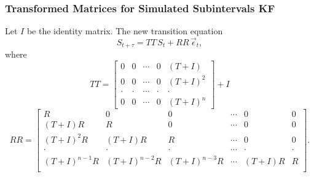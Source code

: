 \documentclass{beamer}
\begin{document}
\begin{frame}
  \frametitle{Transformed Matrices for Simulated Subintervals KF}
Let $I$ be the identity matrix. The new transition equation
\[S_{t+\tau} = TT\, S_t + RR\,\vec{\epsilon}_t, \]
where
\[TT =
\begin{bmatrix}
  0 & 0 & \cdots &  0 & (T+I)\\
0 & 0 & \cdots & 0 & (T+I)^2\\
\cdot & \cdot & \cdots & \cdot & \cdot\\
0 & 0 & \cdots & 0 & (T+I)^n
\end{bmatrix} + I\]
\[RR =
\begin{bmatrix}
  R & 0 & 0 & \cdots & 0 & 0 \\
(T+I)R & R & 0 & \cdots & 0 & 0\\
(T+I)^2R & (T+I)R & R & \cdots & 0 & 0\\
\cdot & \cdot &  \cdot & \cdots & \cdot & \cdot\\
(T+I)^{n-1}R & (T+I)^{n-2}R & (T+I)^{n-3}R & \cdots & (T+I)R & R\\
\end{bmatrix}.
\]
\end{frame}
\end{document}
